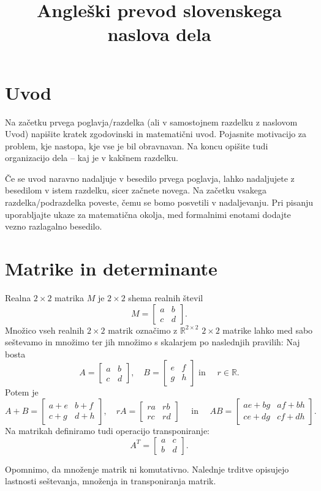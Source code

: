 \documentclass[GmVic, tisk]{gv}
\title{Angleški prevod slovenskega naslova dela}
\newcommand{\R}{\mathbb R}
\begin{document}
\section{Uvod}

Na začetku prvega poglavja/razdelka (ali v samostojnem razdelku z naslovom
Uvod) napišite kratek zgodovinski in matematični uvod. Pojasnite motivacijo za
problem, kje nastopa, kje vse je bil obravnavan. Na koncu opišite tudi
organizacijo dela -- kaj je v kakšnem razdelku.

Če se uvod naravno nadaljuje v besedilo prvega poglavja, lahko nadaljujete z
besedilom v istem razdelku, sicer začnete novega. Na začetku vsakega
razdelka/podraz\-delka poveste, čemu se bomo posvetili v nadaljevanju. Pri
pisanju uporabljajte ukaze za matematična okolja, med formalnimi enotami
dodajte vezno razlagalno besedilo.

\section{Matrike in determinante}
\begin{definicija} Realna ${2\times 2}$ matrika $M$  je ${2\times 2}$ shema realnih števil
$$M=
     \begin{bmatrix}
         a&b\\
         c&d
      \end{bmatrix}.
$$
Množico vseh realnih ${2\times 2}$ matrik označimo z $\R^{2\times 2}$
${2\times 2}$ matrike lahko med sabo seštevamo in množimo ter jih množimo s skalarjem po naslednjih pravilih:
Naj bosta         
$$A=
     \begin{bmatrix}
         a&b\\
         c&d
      \end{bmatrix},  \quad
  B=
     \begin{bmatrix}
         e&f\\
         g&h      \end{bmatrix} \mbox{ in } \quad r\in \R.
$$
Potem je 
$$
A + B = \begin{bmatrix}
         a+e&b+f\\
         c+g&d+h
      \end{bmatrix}, \quad 
rA= \begin{bmatrix}
         ra&rb\\
         rc&rd
      \end{bmatrix} \quad \mbox{ in } \quad
AB=  \begin{bmatrix}
         ae+bg&af+bh\\
         ce+dg&cf+dh
      \end{bmatrix}.
$$
Na matrikah definiramo tudi operacijo transponiranje:
 $$A^{T}=
     \begin{bmatrix}
         a&c\\
         b&d
      \end{bmatrix}. 
$$ 
\end{definicija}
Opomnimo, da množenje matrik ni komutativno. Nalednje trditve opisujejo lastnosti seštevanja, množenja in transponiranja matrik.
\end{document}
